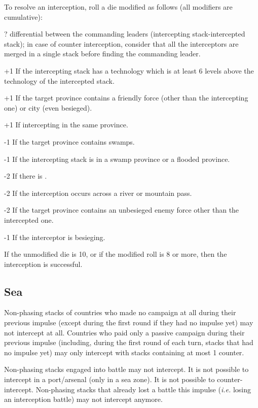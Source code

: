 To resolve an interception, roll a die modified as follows (all modifiers are
cumulative):
\begin{modlist}
\item[\textplusminus?] \Man differential between the commanding leaders
  (intercepting stack-intercepted stack); in case of counter interception,
  consider that all the interceptors are merged in a single stack before
  finding the commanding leader.
\item[+1] If the intercepting stack has a technology which is at least 6
  levels above the technology of the intercepted stack.
\item[+1] If the target province contains a friendly force (other than the
  intercepting one) or city (even besieged).
\item[+1] If intercepting in the same province.
\item[-1] If the target province contains swamps.
\item[-1] If the intercepting stack is in a swamp province or a flooded
  province.
\item[-2] If there is .
\item[-2] If the interception occurs across a river or mountain pass.
\item[-2] If the target province contains an unbesieged enemy force other than
  the intercepted one.
\item[-1] If the interceptor is besieging.
\end{modlist}

If the unmodified die is 10, or if the modified roll is 8 or more, then the
interception is successful.

\subsection{Sea}
Non-phasing stacks of countries who made no campaign at all during their
previous impulse (except during the first round if they had no impulse yet)
may not intercept at all. Countries who paid only a passive campaign during
their previous impulse (including, during the first round of each turn, stacks
that had no impulse yet) may only intercept with stacks containing at most 1
\FLEET counter.

Non-phasing stacks engaged into battle may not intercept. It is not possible
to intercept in a port/arsenal (only in a sea zone). It is not possible to
counter-intercept. Non-phasing stacks that already lost a battle this impulse
(\emph{i.e.} losing an interception battle) may not intercept anymore.

